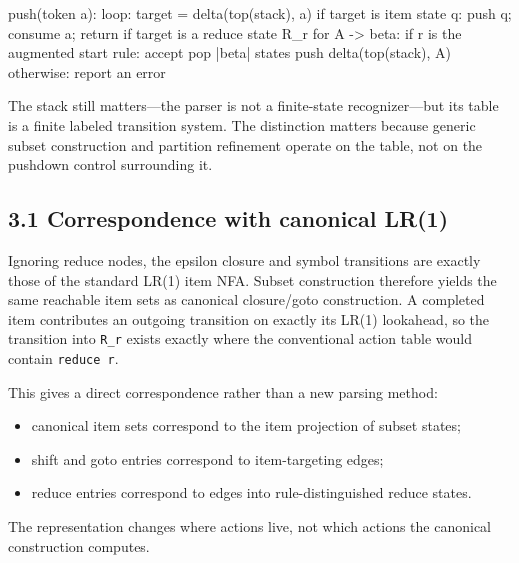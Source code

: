 \documentclass[
  10pt,
]{article}
\newenvironment{Shaded}{}{}
\newcommand{\NormalTok}[1]{#1}
\providecommand{\tightlist}{%
  \setlength{\itemsep}{0pt}\setlength{\parskip}{0pt}}
\begin{document}
\begin{Shaded}
\begin{Highlighting}[]
\NormalTok{push(token a):}
\NormalTok{  loop:}
\NormalTok{    target = delta(top(stack), a)}
\NormalTok{    if target is item state q:}
\NormalTok{      push q; consume a; return}
\NormalTok{    if target is a reduce state R\_r for A {-}\textgreater{} beta:}
\NormalTok{      if r is the augmented start rule: accept}
\NormalTok{      pop |beta| states}
\NormalTok{      push delta(top(stack), A)}
\NormalTok{    otherwise:}
\NormalTok{      report an error}
\end{Highlighting}
\end{Shaded}

The stack still matters---the parser is not a finite-state
recognizer---but its table is a finite labeled transition system. The
distinction matters because generic subset construction and partition
refinement operate on the table, not on the pushdown control surrounding
it.

\hypertarget{31-correspondence-with-canonical-lr1}{%
\subsection{3.1 Correspondence with canonical
LR(1)}\label{31-correspondence-with-canonical-lr1}}

Ignoring reduce nodes, the epsilon closure and symbol transitions are
exactly those of the standard LR(1) item NFA. Subset construction
therefore yields the same reachable item sets as canonical closure/goto
construction. A completed item contributes an outgoing transition on
exactly its LR(1) lookahead, so the transition into \texttt{R\_r} exists
exactly where the conventional action table would contain
\texttt{reduce\ r}.

This gives a direct correspondence rather than a new parsing method:

\begin{itemize}
\tightlist
\item
  canonical item sets correspond to the item projection of subset
  states;
\item
  shift and goto entries correspond to item-targeting edges;
\item
  reduce entries correspond to edges into rule-distinguished reduce
  states.
\end{itemize}

The representation changes where actions live, not which actions the
canonical construction computes.
\end{document}
